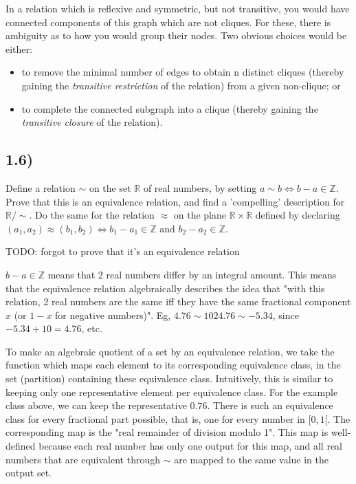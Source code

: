 \documentclass[12pt, letterpaper, twoside]{report}
\begin{document}
In a relation which is reflexive and symmetric, but not transitive, you would have connected components of this graph which are not cliques. For these, there is ambiguity as to how you would group their nodes. Two obvious choices would be either:

\begin{itemize}
	\item to remove the minimal number of edges to obtain n distinct cliques (thereby gaining the \textit{transitive restriction} of the relation) from a given non-clique; or

	\item to complete the connected subgraph into a clique (thereby gaining the \textit{transitive closure} of the relation).
\end{itemize}



\subsection*{1.6)}

Define a relation $\sim$ on the set $\mathbb{R}$ of real numbers, by setting $a \sim b \Leftrightarrow b - a \in \mathbb{Z}$. Prove that this is an equivalence relation, and find a 'compelling' description for $\mathbb{R}/\sim$. Do the same for the relation $\approx$ on the plane $\mathbb{R} \times \mathbb{R}$ defined by declaring $(a_1, a_2) \approx (b_1, b_2) \Leftrightarrow b_1 - a_1 \in \mathbb{Z} \text{ and } b_2 - a_2 \in \mathbb{Z}$.

TODO: forgot to prove that it's an equivalence relation

$b - a \in \mathbb{Z}$ means that 2 real numbers differ by an integral amount. This means that the equivalence relation algebraically describes the idea that "with this relation, 2 real numbers are the same iff they have the same fractional component $x$ (or $1 - x$ for negative numbers)". Eg, $4.76 \sim 1024.76 \sim -5.34$, since $-5.34 + 10 = 4.76$, etc.

To make an algebraic quotient of a set by an equivalence relation, we take the function which maps each element to its corresponding equivalence class, in the set (partition) containing these equivalence class. Intuitively, this is similar to keeping only one representative element per equivalence class. For the example class above, we can keep the representative $0.76$. There is such an equivalence class for every fractional part possible, that is, one for every number in $[0, 1[$. The corresponding map is the "real remainder of division modulo 1". This map is well-defined because each real number has only one output for this map, and all real numbers that are equivalent through $\sim$ are mapped to the same value in the output set.
\end{document}
